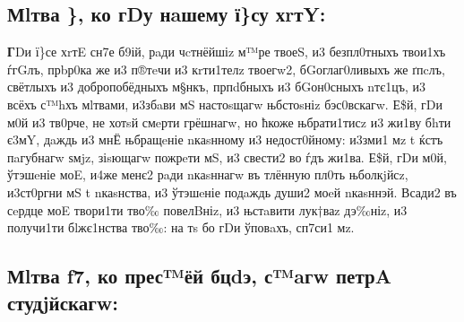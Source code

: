 \subsection[Молитва 8, ко Господу нашему Иисусу Христу]
{Мlтва \}, ко гDу нaшему ї\}су хrтY:}

\textbf{Г}Dи ї\}се хrтE сн7е б9ій, рaди чcтнёйшіz м™ре твоеS, и3 безпл0тныхъ
твои1хъ ѓгGлъ, прbр0ка же и3 п®тeчи и3 кrти1телz твоегw2, бGоглаг0ливыхъ
же ґпcлъ, свётлыхъ и3 добропобёдныхъ м§нкъ, прпdбныхъ и3 бGон0сныхъ
nтє1цъ, и3 всёхъ с™hхъ мlтвами, и3збaви мS настоsщагw њбстоsніz
бэс0вскагw. Е\$й, гDи м0й и3 тв0рче, не хотsй смeрти грёшнагw, но ћкоже
њбрати1тисz и3 жи1ву бhти є3мY, дaждь и3 мнЁ њбращeніе nкаsнному и3
недост0йному: и3зми1 мz t ќстъ пaгубнагw ѕмjz, зіsющагw пожрeти мS, и3
свести2 во ѓдъ жи1ва. Е\$й, гDи м0й, ўтэшeніе моE, и4же менє2 рaди
nкаsннагw въ тлённую пл0ть њболкjйсz, и3ст0ргни мS t nкаsнства, и3
ўтэшeніе подaждь души2 моeй nкаsннэй. Всади2 въ сeрдце моE твори1ти тво‰
повелBніz, и3 њстaвити лук†ваz дэ‰ніz, и3 получи1ти бlжє1нства тво‰: на
тs бо гDи ўповaхъ, сп7си1 мz.

\subsection[Молитва 9, ко Пресвятeй Богородице, святаго Петра Студийскаго]
{Мlтва f7, ко прес™ёй бцdэ, с™aгw петрA студjйскагw:}

